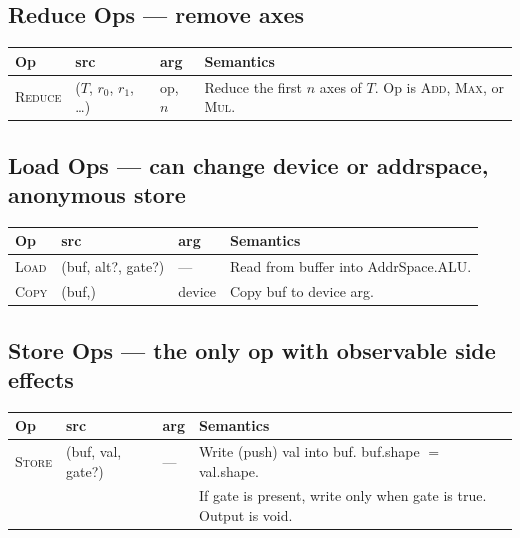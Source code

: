 \documentclass[10pt,letterpaper]{article}
\newcommand{\op}[1]{\textsc{#1}}
\begin{document}
\subsection*{{\color{reducered}Reduce Ops} \normalfont\small--- remove axes}

\begin{tabular}{@{}l l l l@{}}
\toprule
\textbf{Op} & \textbf{src} & \textbf{arg} & \textbf{Semantics} \\
\midrule
\op{Reduce} & ($T$, $r_0$, $r_1$, \ldots) & op, $n$ & Reduce the first $n$ axes of $T$. Op is \op{Add}, \op{Max}, or \op{Mul}. \\
\bottomrule
\end{tabular}

\subsection*{{\color{loadred}Load Ops} \normalfont\small--- can change device or addrspace, anonymous store}

\begin{tabular}{@{}l l l l@{}}
\toprule
\textbf{Op} & \textbf{src} & \textbf{arg} & \textbf{Semantics} \\
\midrule
\op{Load} & (buf, alt?, gate?) & --- & Read from buffer into AddrSpace.ALU. \\
\op{Copy} & (buf,) & device & Copy buf to device arg. \\
\bottomrule
\end{tabular}

\subsection*{{\color{multipurple}Store Ops} \normalfont\small--- the only op with observable side effects}

\begin{tabular}{@{}l l l l@{}}
\toprule
\textbf{Op} & \textbf{src} & \textbf{arg} & \textbf{Semantics} \\
\midrule
\op{Store} & (buf, val, gate?) & --- & Write (push) val into buf. buf.shape $=$ val.shape. \\
  & & & If gate is present, write only when gate is true. Output is void. \\
\bottomrule
\end{tabular}
\end{document}
